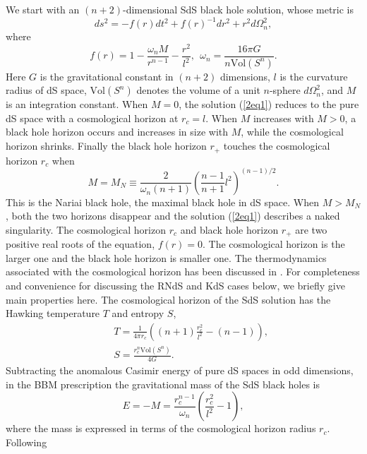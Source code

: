 \documentclass[a4paper,12pt]{article}
\begin{document}
We start with an $(n+2)$-dimensional SdS black hole solution, whose metric is
\begin{equation}
\label{2eq1}
ds^2 =-f(r)dt^2 +f(r)^{-1}dr^2 +r^2 d\Omega_n^2,
\end{equation}
where
\begin{equation}
f(r) = 1 -\frac{\omega_n M}{r^{n-1}} -\frac{r^2}{l^2}, 
\ \ \omega_n=\frac{16\pi G}{n\mbox {Vol}(S^n)}. 
\end{equation}
Here $G$ is the gravitational constant in $(n+2)$ dimensions, $l$ is the curvature radius
of dS space, $\mbox{Vol}(S^n)$ denotes the volume of a unit $n$-sphere $d\Omega_n^2$, and
$M$ is an integration constant. When $M=0$, the solution (\ref{2eq1}) reduces to the pure
dS space with a cosmological horizon at $r_c=l$. When $M$ increases with $M>0$, a black hole
horizon occurs and increases in size with $M$, while the cosmological horizon shrinks.
Finally the black hole horizon $r_+$ touches the cosmological horizon $r_c$ when
\begin{equation}
\label{2eq3}
M= M_N \equiv \frac{2}{\omega_n (n+1)}\left(\frac{n-1}{n+1}l^2\right)^{(n-1)/2}.
\end{equation}
This is the Nariai black hole, the maximal black hole in dS space. When $M>M_N$, both the
two horizons disappear and the solution (\ref{2eq1}) describes a naked singularity.  
The cosmological horizon $r_c$ and black hole horizon $r_+$ are two positive 
real roots of the 
equation, $f(r)=0$. The cosmological horizon is the larger one  and the black hole horizon
is smaller one. The thermodynamics associated with the cosmological horizon has been discussed
in \cite{Cai1}. For completeness and convenience for discussing the RNdS and KdS cases below,
we briefly give main properties here. The cosmological horizon of the SdS solution has
the Hawking temperature $T$ and entropy $S$,
\begin{eqnarray}
\label{2eq4}
&&  T=\frac{1}{4\pi r_c}\left((n+1)\frac{r_c^2}{l^2} -(n-1)\right), \nonumber \\
&& S=\frac{r_c^n \mbox{Vol}(S^n)}{4G}.
\end{eqnarray}
Subtracting the anomalous Casimir energy of pure dS spaces in odd dimensions, in the BBM 
prescription the gravitational mass of the SdS black holes is~\cite{BBM,Mann} 
\begin{equation}
\label{2eq5}
E=-M=\frac{r_c^{n-1}}{\omega_n}\left(\frac{r_c^2}{l^2}-1\right), 
\end{equation}
where the mass is expressed in terms of the cosmological horizon radius $r_c$. Following
\end{document}
